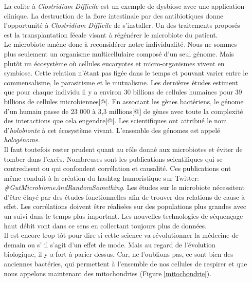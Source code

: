 \documentclass[12pt,a4paper]{article}
\begin{document}
La colite à \textit{Clostridium Difficile} est un exemple de dysbiose avec une application clinique. La destruction de la flore intestinale par des antibiotiques donne l'opportunité à \textit{Clostridium Difficile} de s'installer. Un des traitements proposés est la transplantation fécale visant à régénérer le microbiote du patient. \\
Le microbiote amène donc à reconsidérer notre individualité. Nous ne sommes plus seulement un organisme multicellulaire composé d'un seul génome. Mais plutôt un écosystème où cellules eucaryotes et micro-organismes vivent en symbiose. Cette relation n'étant pas figée dans le temps et pouvant varier entre le commensalisme, le parasitisme et le mutualisme. Les dernières études estiment que pour chaque individu il y a environ 30 billions de cellules humaines pour 39 billions de cellules microbiennes[@]. En associant les gènes bactériens, le génome d’un humain passe de 23 000  à 3,3 millions[@] de gènes avec toute la complexité des interactions que cela engendre[@]. Les scientifiques ont attribué le nom d’\textit{holobionte} à cet écosystème vivant. L'ensemble des génomes est appelé \textit{hologénome}. \\
Il faut toutefois rester prudent quant au rôle donné aux microbiotes et éviter de tomber dans l'excès. Nombreuses sont les publications scientifiques qui se contredisent ou qui confondent corrélation et causalité. Ces publications ont même conduit à la création du hashtag humoristique sur Twitter: \textit{\#GutMicrobiomeAndRandomSomething}. 
Les études sur le microbiote nécessitent d'être étayé par des études fonctionnelles afin de trouver des relations de cause à effet. Les corrélations doivent être réalisées sur des populations plus grandes avec un suivi dans le temps plus important. Les nouvelles technologies de séquençage haut débit vont dans ce sens en collectant toujours plus de données.\\
Il est encore trop tôt pour dire si cette science va révolutionner la médecine de demain ou s’ il s'agit d'un effet de mode. Mais au regard de l'évolution biologique, il y a fort à parier dessus. Car, ne l'oublions pas, ce sont bien des anciennes bactéries, qui permettent à l'ensemble de nos cellules de respirer et que nous appelons maintenant des mitochondries (Figure \ref{mitochondrie}). 
\end{document}
